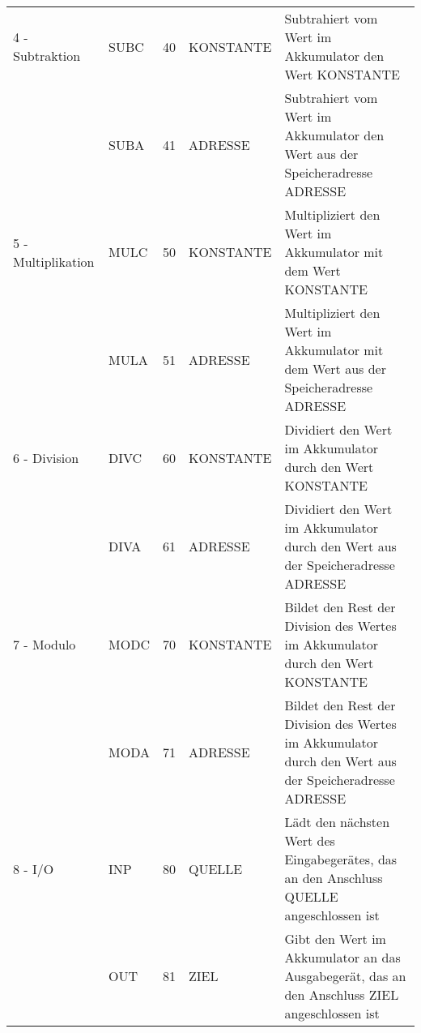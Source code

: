 \documentclass[a4paper,10pt]{article}
\begin{document}
\begin{table}[h]
\begin{tabular}{l|l|c|l|p{6.85cm}}
\hline
4 - Subtraktion & SUBC & 40 & KONSTANTE & Subtrahiert vom Wert im Akkumulator den Wert KONSTANTE\\
& SUBA & 41 & ADRESSE & Subtrahiert vom Wert im Akkumulator den Wert aus der Speicheradresse ADRESSE\\
\hline
5 - Multiplikation & MULC & 50 & KONSTANTE & Multipliziert den Wert im Akkumulator mit dem Wert KONSTANTE\\
& MULA & 51 & ADRESSE & Multipliziert den Wert im Akkumulator mit dem Wert aus der Speicheradresse ADRESSE\\
\hline
6 - Division & DIVC & 60 & KONSTANTE & Dividiert den Wert im Akkumulator durch den Wert KONSTANTE\\
& DIVA & 61 & ADRESSE & Dividiert den Wert im Akkumulator durch den Wert aus der Speicheradresse ADRESSE\\
\hline
7 - Modulo & MODC & 70 & KONSTANTE & Bildet den Rest der Division des Wertes im Akkumulator durch den Wert KONSTANTE\\
& MODA & 71 & ADRESSE & Bildet den Rest der Division des Wertes im Akkumulator durch den Wert aus der Speicheradresse ADRESSE\\
\hline
8 - I/O & INP & 80 & QUELLE & Lädt den nächsten Wert des Eingabegerätes, das an den Anschluss QUELLE angeschlossen ist\\
& OUT & 81 & ZIEL & Gibt den Wert im Akkumulator an das Ausgabegerät, das an den Anschluss ZIEL angeschlossen ist\\

\end{tabular}
\end{table}
\end{document}
